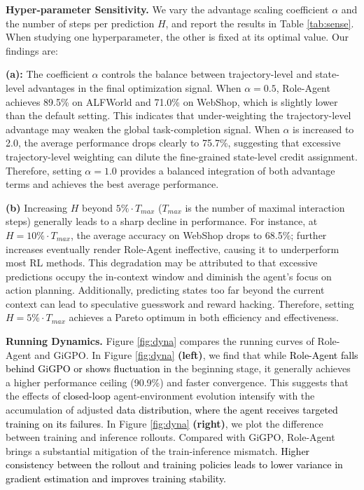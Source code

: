 \documentclass[11pt]{article}
\begin{document}
\noindent\textbf{Hyper-parameter Sensitivity.} We vary the advantage scaling coefficient $\alpha$ and the number of steps per prediction $H$, and report the results in Table \ref{tab:sense}. When studying one hyperparameter, the other is fixed at its optimal value. Our findings are:

\textbf{(a):} The coefficient $\alpha$ controls the balance between trajectory-level and state-level advantages in the final optimization signal. When $\alpha=0.5$, Role-Agent achieves 89.5\% on ALFWorld and 71.0\% on WebShop, which is slightly lower than the default setting. This indicates that under-weighting the trajectory-level advantage may weaken the global task-completion signal. When $\alpha$ is increased to 2.0, the average performance drops clearly to 75.7\%, suggesting that excessive trajectory-level weighting can dilute the fine-grained state-level credit assignment. Therefore, setting $\alpha=1.0$ provides a balanced integration of both advantage terms and achieves the best average performance.




\textbf{(b)} Increasing $H$ beyond $5\%\cdot T_{max}$ ($T_{max}$ is the number of maximal interaction steps) generally leads to a sharp decline in performance. For instance, at $H\!\!=\!\!10\%\cdot T_{max}$, the average accuracy on WebShop drops to 68.5\%; further increases eventually render Role-Agent ineffective, causing it to underperform most RL methods. This degradation may be attributed to that excessive predictions occupy the in-context window and diminish the agent's focus on action planning. Additionally, predicting states too far beyond the current context can lead to speculative guesswork and reward hacking. Therefore, setting $H\!\!=\!\!5\%\cdot T_{max}$ achieves a Pareto optimum in both efficiency and effectiveness.



\noindent\textbf{Running Dynamics.} Figure \ref{fig:dyna} compares the running curves of Role-Agent and GiGPO. In Figure \ref{fig:dyna} \textbf{(left)}, we find that while \textcolor{black}{Role-Agent falls behind GiGPO or shows fluctuation} in the beginning stage, it generally achieves a higher performance ceiling (90.9\%) and faster convergence. This suggests that the effects of \textcolor{black}{closed-loop} agent-environment evolution intensify with the accumulation of adjusted \textcolor{black}{data distribution, where the agent receives targeted training on its failures}. In Figure \ref{fig:dyna} \textbf{(right)}, we plot the difference between training and inference rollouts. Compared with GiGPO, Role-Agent brings a substantial mitigation of the train-inference mismatch. \textcolor{black}{Higher consistency between the rollout and training policies leads to lower variance in gradient estimation and improves training stability.}
\end{document}
